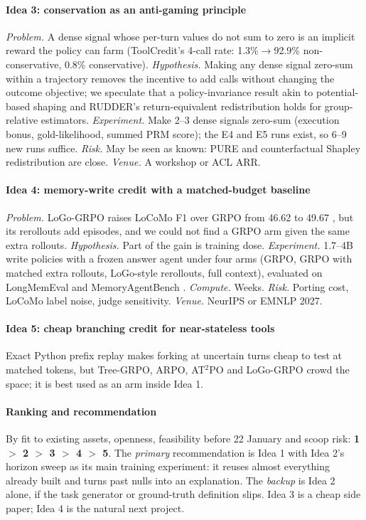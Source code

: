 \paragraph{Idea 3: conservation as an anti-gaming principle}
\emph{Problem.} A dense signal whose per-turn values do not sum to zero is an implicit reward the policy can farm (ToolCredit's 4-call rate: 1.3\%$\to$92.9\% non-conservative, 0.8\% conservative). \emph{Hypothesis.} Making any dense signal zero-sum within a trajectory removes the incentive to add calls without changing the outcome objective; we speculate that a policy-invariance result akin to potential-based shaping \citep{ng1999policy} and RUDDER's return-equivalent redistribution \citep{arjonamedina2019rudder} holds for group-relative estimators. \emph{Experiment.} Make 2--3 dense signals zero-sum (execution bonus, gold-likelihood, summed PRM score); the E4 and E5 runs exist, so 6--9 new runs suffice. \emph{Risk.} May be seen as known: PURE \citep{cheng2025stop} and counterfactual Shapley redistribution \citep{li2026counterfactual} are close. \emph{Venue.} A workshop or ACL ARR.

\paragraph{Idea 4: memory-write credit with a matched-budget baseline}
\emph{Problem.} LoGo-GRPO raises LoCoMo F1 over GRPO from 46.62 to 49.67 \citep{yan2026memory}, but its rerollouts add episodes, and we could not find a GRPO arm given the same extra rollouts. \emph{Hypothesis.} Part of the gain is training dose. \emph{Experiment.} 1.7--4B write policies with a frozen answer agent under four arms (GRPO, GRPO with matched extra rollouts, LoGo-style rerollouts, full context), evaluated on LongMemEval \citep{wu2024longmemeval} and MemoryAgentBench \citep{hu2025evaluating}. \emph{Compute.} Weeks. \emph{Risk.} Porting cost, LoCoMo label noise\unverified, judge sensitivity. \emph{Venue.} NeurIPS or EMNLP 2027.

\paragraph{Idea 5: cheap branching credit for near-stateless tools}
Exact Python prefix replay makes forking at uncertain turns \citep{ji2025tree} cheap to test at matched tokens, but Tree-GRPO, ARPO, AT$^2$PO and LoGo-GRPO crowd the space; it is best used as an arm inside Idea 1.

\paragraph{Ranking and recommendation}
By fit to existing assets, openness, feasibility before 22 January and scoop risk: \textbf{1 $>$ 2 $>$ 3 $>$ 4 $>$ 5}. The \emph{primary} recommendation is Idea 1 with Idea 2's horizon sweep as its main training experiment: it reuses almost everything already built and turns past nulls into an explanation. The \emph{backup} is Idea 2 alone, if the task generator or ground-truth definition slips. Idea 3 is a cheap side paper; Idea 4 is the natural next project.

